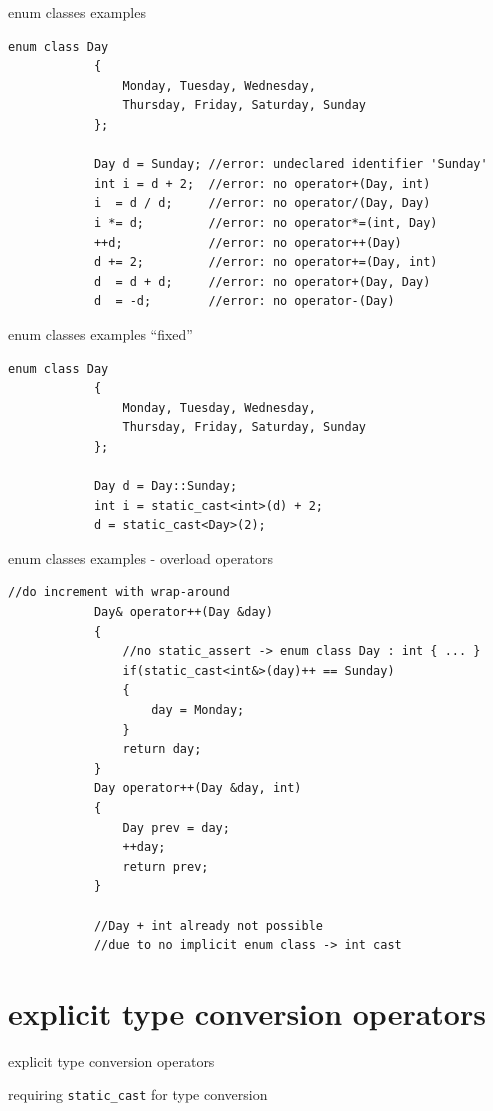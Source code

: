 	\begin{frame}[fragile=singleslide]{enum classes examples}
		\begin{lstlisting}[gobble=12]
			enum class Day
			{
			    Monday, Tuesday, Wednesday,
			    Thursday, Friday, Saturday, Sunday
			};
			
			Day d = Sunday; //error: undeclared identifier 'Sunday'
			int i = d + 2;  //error: no operator+(Day, int)
			i  = d / d;     //error: no operator/(Day, Day)
			i *= d;         //error: no operator*=(int, Day)
			++d;            //error: no operator++(Day)
			d += 2;         //error: no operator+=(Day, int)
			d  = d + d;     //error: no operator+(Day, Day)
			d  = -d;        //error: no operator-(Day)
		\end{lstlisting}
	\end{frame}
	
	\begin{frame}[fragile=singleslide]{enum classes examples ``fixed''}
		\begin{lstlisting}[gobble=12]
			enum class Day
			{
			    Monday, Tuesday, Wednesday,
			    Thursday, Friday, Saturday, Sunday
			};
			
			Day d = Day::Sunday;
			int i = static_cast<int>(d) + 2;
			d = static_cast<Day>(2);
		\end{lstlisting}
		
		\texttt{\emptyline[3.29]}
	\end{frame}
	
	\begin{frame}[fragile=singleslide]{enum classes examples - overload operators}
		\begin{lstlisting}[gobble=12]
			//do increment with wrap-around
			Day& operator++(Day &day)
			{
			    //no static_assert -> enum class Day : int { ... }
			    if(static_cast<int&>(day)++ == Sunday)
			    {
			        day = Monday;
			    }
			    return day;
			}
			Day operator++(Day &day, int)
			{
			    Day prev = day;
			    ++day;
			    return prev;
			}
			
			//Day + int already not possible
			//due to no implicit enum class -> int cast
		\end{lstlisting}
	\end{frame}
	
	\section{explicit type conversion operators}
	\begin{frame}
		\begin{center}
			{\Huge explicit type conversion operators}
			
			\emptyline
			{\Large requiring \lstinline|static_cast| for type conversion}
		\end{center}
	\end{frame}
	
